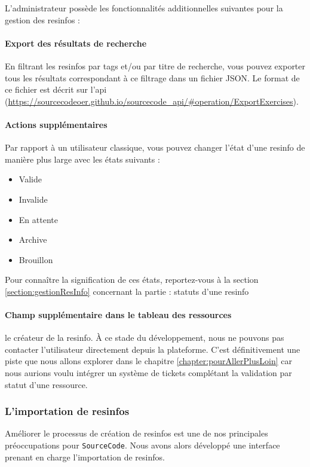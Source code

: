 L'administrateur possède les fonctionnalités additionnelles suivantes pour la gestion des \glspl{resinfo} :

\paragraph{Export des résultats de recherche} En filtrant les \glspl{resinfo} par \glspl{tag} et/ou par titre de recherche, vous pouvez exporter tous les résultats correspondant à ce filtrage dans un fichier JSON. Le format de ce fichier est décrit sur l'api (\url{https://sourcecodeoer.github.io/sourcecode_api/#operation/ExportExercises}).

\paragraph{Actions supplémentaires} Par rapport à un utilisateur classique, vous pouvez changer l'état d'une \gls{resinfo} de manière plus large avec les états suivants :

\begin{itemize}
    \item Valide
    \item Invalide
    \item En attente
    \item Archive
    \item Brouillon
\end{itemize}

Pour connaître la signification de ces états, reportez-vous à la section \ref{section:gestionResInfo} concernant la partie : statuts d'une \gls{resinfo}

\paragraph{Champ supplémentaire dans le tableau des ressources} le créateur de la \gls{resinfo}. À ce stade du développement, nous ne pouvons pas contacter l'utilisateur directement depuis la plateforme. C'est définitivement une piste que nous allons explorer dans le chapitre \ref{chapter:pourAllerPlusLoin} car nous aurions voulu intégrer un système de tickets complétant la validation par statut d'une ressource.

\subsubsection{L'importation de \glspl{resinfo}}

Améliorer le processus de création de \glspl{resinfo} est une de nos principales préoccupations pour \texttt{SourceCode}. Nous avons alors développé une interface prenant en charge l'importation de \glspl{resinfo}.

